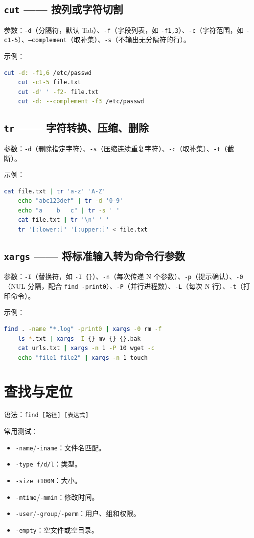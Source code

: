 \subsection*{\texttt{cut} —— 按列或字符切割} 参数：\texttt{-d}（分隔符，默认 Tab）、\texttt{-f}（字段列表，如 \texttt{-f1,3}）、\texttt{-c}（字符范围，如 \texttt{-c1-5}）、\texttt{--complement}（取补集）、\texttt{-s}（不输出无分隔符的行）。

示例：
\begin{lstlisting}[language=bash]
	cut -d: -f1,6 /etc/passwd
	cut -c1-5 file.txt
	cut -d' ' -f2- file.txt
	cut -d: --complement -f3 /etc/passwd
\end{lstlisting}

\subsection*{\texttt{tr} —— 字符转换、压缩、删除} 参数：\texttt{-d}（删除指定字符）、\texttt{-s}（压缩连续重复字符）、\texttt{-c}（取补集）、\texttt{-t}（截断）。

示例：
\begin{lstlisting}[language=bash]
	cat file.txt | tr 'a-z' 'A-Z'
	echo "abc123def" | tr -d '0-9'
	echo "a    b   c" | tr -s ' '
	cat file.txt | tr '\n' ' '
	tr '[:lower:]' '[:upper:]' < file.txt
\end{lstlisting}

\subsection*{\texttt{xargs} —— 将标准输入转为命令行参数} 参数：\texttt{-I}（替换符，如 \texttt{-I \{\}}）、\texttt{-n}（每次传递 N 个参数）、\texttt{-p}（提示确认）、\texttt{-0}（NUL 分隔，配合 \texttt{find -print0}）、\texttt{-P}（并行进程数）、\texttt{-L}（每次 N 行）、\texttt{-t}（打印命令）。

示例：
\begin{lstlisting}[language=bash]
	find . -name "*.log" -print0 | xargs -0 rm -f
	ls *.txt | xargs -I {} mv {} {}.bak
	cat urls.txt | xargs -n 1 -P 10 wget -c
	echo "file1 file2" | xargs -n 1 touch
\end{lstlisting}

\section{查找与定位}

语法：\texttt{find [路径] [表达式]}

常用测试：
\begin{itemize}
\item \texttt{-name}/\texttt{-iname}：文件名匹配。
\item \texttt{-type f/d/l}：类型。
\item \texttt{-size +100M}：大小。
\item \texttt{-mtime}/\texttt{-mmin}：修改时间。
\item \texttt{-user}/\texttt{-group}/\texttt{-perm}：用户、组和权限。
\item \texttt{-empty}：空文件或空目录。
\end{itemize}

